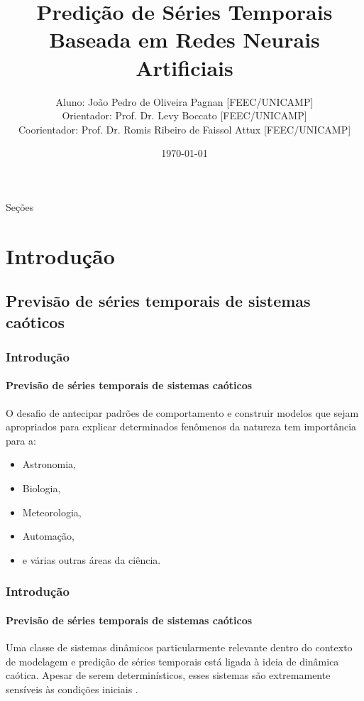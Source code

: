 \documentclass[aspectratio=169]{beamer}
\title[XXIX Congresso de Iniciação Científica - UNICAMP]{
 Predição de Séries Temporais Baseada em Redes Neurais
Artificiais}
\author[João Pedro O. Pagnan]{ \footnotesize
  Aluno: João Pedro de Oliveira Pagnan [FEEC/UNICAMP]\\
  Orientador: Prof. Dr. Levy Boccato [FEEC/UNICAMP]\\
  Coorientador: Prof. Dr. Romis Ribeiro de Faissol Attux [FEEC/UNICAMP]\\\medskip
  }
\institute[Universidade Estadual de Campinas ]{
  Departamento de Engenharia de Computação e Automação Industrial -- DCA \\
  }
\date{\scriptsize \today}
\begin{document}
\begin{frame}
  \titlepage
\end{frame}

\begin{frame}{Seções}
    \footnotesize \tableofcontents
\end{frame}

\section{Introdução}
\subsection{Previsão de séries temporais de sistemas caóticos}
\begin{frame}
    \frametitle{Introdução}
    \framesubtitle{Previsão de séries temporais de sistemas caóticos}
    \justifying O desafio de antecipar padrões de comportamento e construir modelos que sejam apropriados para explicar determinados fenômenos da natureza tem importância para a:
    
    \begin{itemize}[<+-| alert@+>]
        \item Astronomia,
        \item Biologia,
        \item Meteorologia,
        \item Automação,
        \item e várias outras áreas da ciência.
    \end{itemize}
\end{frame}

\begin{frame}
    \frametitle{Introdução}
    \framesubtitle{Previsão de séries temporais de sistemas caóticos}
    \justifying Uma classe de sistemas dinâmicos particularmente relevante dentro do contexto de modelagem e predição de séries temporais está ligada à ideia de dinâmica caótica. Apesar de serem determinísticos, esses sistemas são extremamente sensíveis às condições iniciais \cite{fiedler1994caos}.

\end{frame}
\end{document}

